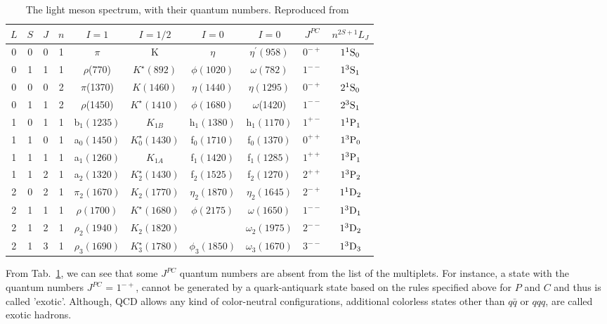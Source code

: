 \begin{table}[H]
    \centering
    \caption{The light meson spectrum, with their quantum numbers. Reproduced from~\cite{Tanabashi18}}
    \label{tab.1.1}
    \begin{tabular}{cccccccccc}
        \hline
        $L$\qquad & $S$\qquad & $J$\qquad & $n$\qquad & $I=1$\qquad & $I=1/2$ \qquad & $I=0$\qquad & $I=0$\qquad & $J^{PC}$\qquad & $n^{2S+1}L_J$\qquad \\
        \hline
        0 & 0 & 0 & 1 & $\pi$ & K & $\eta$ & $\eta^{\prime}(958)$ & $0^{-+}$ & $\rm 1^1S_0$ \\
        0 & 1 & 1 & 1 & $\rho$(770) & $K^{\star}(892)$ & $\phi(1020)$ & $\omega(782)$ & $1^{--}$ & $\rm 1^3S_1$ \\
        \hline
        0 & 0 & 0 & 2 & $\pi$(1370) &  $K(1460)$  & $\eta (1440)$  & $\eta (1295)$ & $0^{-+}$ & $\rm 2^1S_0$\\
        0 & 1 & 1 & 2 & $\rho$(1450) & $K^{\star}(1410)$ & $\phi (1680)$ & $\omega$(1420) & $1^{--}$ & $\rm 2^3S_1$\\
        \hline        
        1 & 0 & 1 & 1 & b$_1(1235)$ & $K_{1B}$ & h$_1(1380)$ & h$_1(1170)$ \quad & $1^{+-}$ & $\rm 1^1P_1$\\
        1 & 1 & 0 & 1 & a$_0(1450)$ & $K_{0}^{\star}(1430)$ & f$_0(1710)$ & f$_0(1370)$ & $0^{++}$ & $\rm 1^3P_0$\\
        1 & 1 & 1 & 1 & a$_1(1260)$ & $K_{1A}$ & f$_1(1420)$ & f$_1(1285)$ & $1^{++}$ & $\rm 1^3P_1$\\
        1 & 1 & 2 & 1 & a$_2(1320)$ & $K_{2}^{\star}(1430)$ & f$_2(1525)$ & f$_2(1270)$ & $2^{++}$ & $\rm 1^3P_2$\\
        \hline
        2 & 0 & 2 & 1 & $\pi_2(1670)$ & $K_{2}(1770)$ & $\eta_2(1870)$ & $\eta_2(1645)$ & $2^{-+}$ & $\rm 1^1D_2$\\
        2 & 1 & 1 & 1 & $\rho(1700)$ & $K^{\star}(1680)$ & $\phi(2175)$ & $\omega(1650)$ & $1^{--}$ & $\rm 1^3D_1$\\
        2 & 1 & 2 & 1 & $\rho_2(1940)$ & $K_2(1820)$ &  & $\omega_2(1975)$ & $2^{--}$ & $\rm 1^3D_2$\\
        2 & 1 & 3 & 1 & $\rho_3(1690)$ & $K^{\star}_3(1780)$ & $\phi_3(1850)$ & $\omega_3(1670)$ & $3^{--}$ & $\rm 1^3D_3$\\
        \hline
    \end{tabular}
\end{table}

From Tab.~\ref{tab.1.1}, we can see that some $J^{PC}$ quantum numbers are absent from the list of the multiplets. For instance, a state with the quantum numbers $J^{PC}$ = $1^{-+}$, cannot be generated by a quark-antiquark state based on the rules specified above for $P$ and $C$ and thus is called 'exotic'. Although, QCD allows any kind of color-neutral configurations, additional colorless states other than $q\bar{q}$ or $qqq$, are called exotic hadrons.

